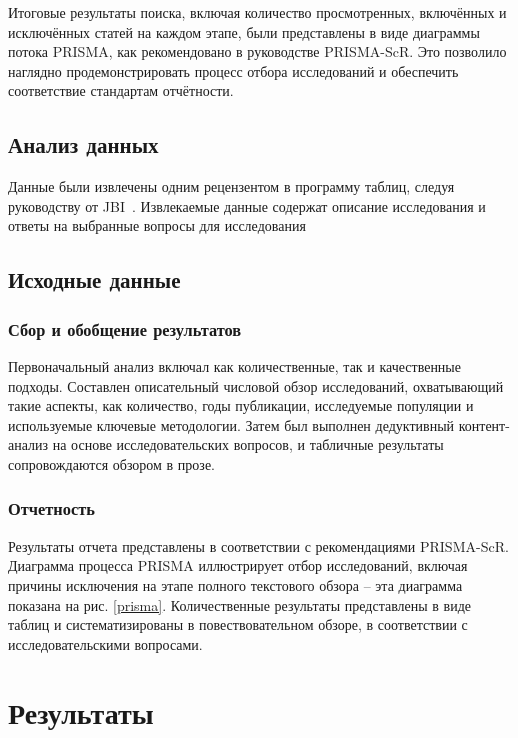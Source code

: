 \documentclass[%
]{report}
\begin{document}
Итоговые результаты поиска, включая количество просмотренных,
включённых и исключённых статей на каждом этапе,
были представлены в виде диаграммы потока PRISMA,
как рекомендовано в руководстве PRISMA-ScR.
Это позволило наглядно продемонстрировать
процесс отбора исследований и обеспечить
соответствие стандартам отчётности.

\subsection{Анализ данных}\label{data-charting-process}

Данные были извлечены одним рецензентом в программу таблиц,
следуя руководству от JBI~\cite{afc61c6cf471416489e36a4bc382d3b9}.
Извлекаемые данные содержат описание исследования и ответы на выбранные вопросы для исследования

\subsection{Исходные данные}\label{data-items}

\subsubsection{Сбор и обобщение результатов}\label{collating-and-summarising-the-results}

Первоначальный анализ включал как количественные,
так и качественные подходы.
Составлен описательный числовой обзор исследований,
охватывающий такие аспекты, как количество,
годы публикации,
исследуемые популяции и используемые ключевые методологии.
Затем был выполнен дедуктивный
контент-анализ на основе исследовательских вопросов,
и табличные результаты сопровождаются обзором в прозе.

\subsubsection{Отчетность}\label{reporting}

Результаты отчета представлены в соответствии
с рекомендациями PRISMA-ScR.
Диаграмма процесса PRISMA иллюстрирует
отбор исследований,
включая причины исключения на этапе
полного текстового обзора -- 
эта диаграмма показана на рис. \ref{prisma}.
Количественные результаты представлены
в виде таблиц и систематизированы в повествовательном обзоре,
в соответствии с исследовательскими вопросами.

\section{Результаты}\label{results}
\end{document}
